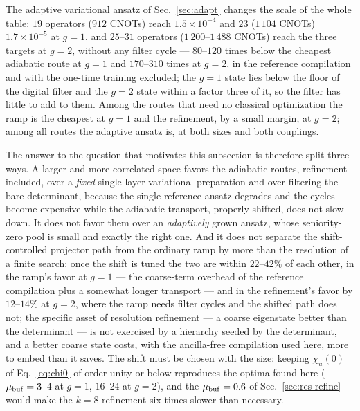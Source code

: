 \documentclass[
  aps,            %
  prc,            %
  reprint,        %
  superscriptaddress,
  floatfix,
  nofootinbib
]{revtex4-2}
\begin{document}
The adaptive variational ansatz of Sec.~\ref{sec:adapt} changes the scale
of the whole table: $19$ operators ($912$ CNOTs) reach $1.5\times10^{-4}$
and $23$ ($1\,104$ CNOTs) $1.7\times10^{-5}$ at $g=1$, and $25$--$31$
operators ($1\,200$--$1\,488$ CNOTs) reach the three targets at $g=2$,
without any filter cycle --- $80$--$120$ times below the cheapest
adiabatic route at $g=1$ and $170$--$310$ times at $g=2$, in the reference
compilation and with the one-time training excluded; the $g=1$ state lies
below the floor of the digital filter and the $g=2$ state within a factor
three of it, so the filter has little to add to them.  Among the routes
that need no classical optimization the ramp is the cheapest at $g=1$ and
the refinement, by a small margin, at $g=2$; among all routes the adaptive
ansatz is, at both sizes and both couplings.

The answer to the question that motivates this subsection is therefore
split three ways.  A larger and more correlated space favors the adiabatic
routes, refinement included, over a \emph{fixed} single-layer variational
preparation and over filtering the bare determinant, because the
single-reference ansatz degrades and the cycles become expensive while the
adiabatic transport, properly shifted, does not slow down.  It does not
favor them over an \emph{adaptively} grown ansatz, whose seniority-zero
pool is small and exactly the right one.  And it does not separate the
shift-controlled projector path from the ordinary ramp by more than the
resolution of a finite search: once the shift is tuned the two are within
$22$--$42\%$ of each other, in the ramp's favor at $g=1$ --- the coarse-term
overhead of the reference compilation plus a somewhat longer transport
--- and in the refinement's favor by $12$--$14\%$ at $g=2$, where the
ramp needs filter cycles and the shifted path does not; the specific asset
of resolution refinement --- a coarse eigenstate better than the
determinant --- is not exercised by a hierarchy seeded by the determinant,
and a better coarse state costs, with the ancilla-free compilation used
here, more to embed than it saves.  The shift must be chosen with the
size: keeping $\chi_u(0)$ of Eq.~\eqref{eq:chi0} of order unity or below
reproduces the optima found here ($\mu_{\rm buf}=3$--$4$ at $g=1$,
$16$--$24$ at $g=2$), and the $\mu_{\rm buf}=0.6$ of Sec.~\ref{sec:res-refine}
would make the $k=8$ refinement six times slower than necessary.

\end{document}
